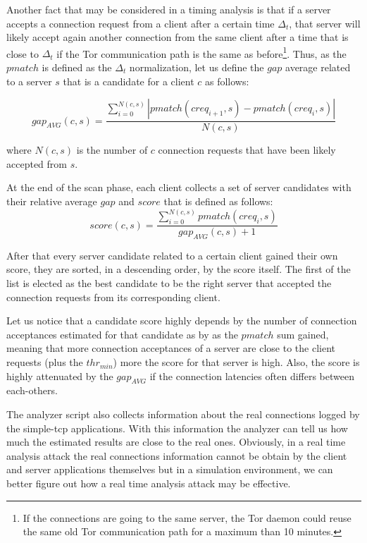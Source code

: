 Another fact that may be considered in a timing analysis is that if a server accepts a
connection request from a client after a certain time $\Delta_t$, that
server will likely accept again another connection from the same client
after a time that is close to $\Delta_t$ if the Tor communication path is the same as
before\footnote{If the connections are going to the same server, the Tor
daemon could reuse the same old Tor communication path for a maximum
than 10 minutes\cite{tormanual}.}. 
Thus, as the $pmatch$ is defined as the $\Delta_t$ normalization, 
let us define the $gap$ average related to a
server $s$ that is a candidate for a client $c$ as follows:

\begin{equation}
\label{eq:gap}
 gap_{AVG}(c,s) = \frac{\sum_{i=0}^{N(c,s)} | pmatch(creq_{i+1},s) -
pmatch(creq_{i},s)
|}{N(c,s)}
\end{equation}

where $N(c,s)$ is the number of $c$ connection requests that have been likely
accepted from $s$.


At the end of the scan phase, each client collects a set of server
candidates with their relative average $gap$ and $score$ that is defined
as follows:
\begin{equation}
	score(c,s) = \frac{\sum_{i=0}^{N(c,s)} pmatch(creq_{i},s)}{gap_{AVG}(c,s) + 1}
\end{equation}

After that every server candidate related to a certain client gained
their own score, they are sorted, in a descending order, by the score
itself. The first of the list is elected as the best candidate to be the
right server that accepted the connection requests from its corresponding
client.

Let us notice that a candidate score highly depends by the number of connection
acceptances estimated for that candidate as by as the $pmatch$ sum gained,
meaning that more connection acceptances of a server are close to the client
requests (plus the $thr_{min}$) more the score for that server is high.
Also, the score is highly attenuated by the $gap_{AVG}$ if the connection
latencies often differs between each-others.


The analyzer script also collects information about the
real connections logged by the simple-tcp applications. With this
information the analyzer can tell us how much the estimated results are
close to the real ones. Obviously, in a real time analysis attack the real connections
information cannot be obtain by the client and server applications themselves 
but in a simulation environment, we can better figure out how a real
time analysis attack may be effective.

